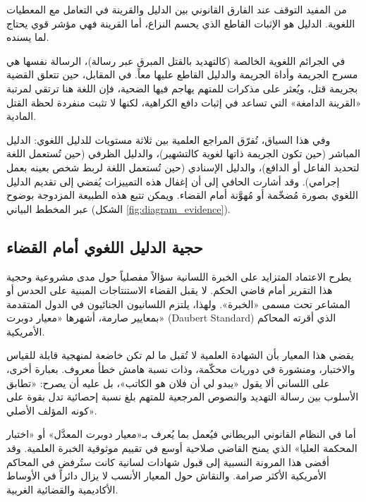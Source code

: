 من المفيد التوقف عند الفارق القانوني بين الدليل والقرينة في التعامل مع المعطيات اللغوية. الدليل هو الإثبات القاطع الذي يحسم النزاع، أما القرينة فهي مؤشر قوي يحتاج لما يسنده.

في الجرائم اللغوية الخالصة (كالتهديد بالقتل المبرق عبر رسالة)، الرسالة نفسها هي مسرح الجريمة وأداة الجريمة والدليل القاطع عليها معاً. في المقابل، حين تتعلق القضية بجريمة قتل، ويُعثر على مذكرات للمتهم يهاجم فيها الضحية، فإن اللغة هنا ترتقي لمرتبة «القرينة الدامغة» التي تساعد في إثبات دافع الكراهية، لكنها لا تثبت منفردة لحظة القتل المادية\autocite[22]{alassimi2018}.

وفي هذا السياق، تُفرّق المراجع العلمية بين ثلاثة مستويات للدليل اللغوي: الدليل المباشر (حين تكون الجريمة ذاتها لغوية كالتشهير)، والدليل الظرفي (حين تُستعمل اللغة لتحديد الفاعل أو الدافع)، والدليل الإسنادي (حين تُستعمل اللغة لربط شخص بعينه بعمل إجرامي). وقد أشارت الحافي إلى أن إغفال هذه التمييزات يُفضي إلى تقديم الدليل اللغوي بصورة مُضخّمة أو مُهوَّنة أمام القضاء\autocite[13]{alhafi2023}. ويمكن تتبع هذه الطبيعة المزدوجة بوضوح عبر المخطط البياني (الشكل \ref{fig:diagram_evidence}).

\diagramEvidence

\subsection{حجية الدليل اللغوي أمام القضاء}

يطرح الاعتماد المتزايد على الخبرة اللسانية سؤالاً مفصلياً حول مدى مشروعية وحجية هذا التقرير أمام قاضي الحكم. لا يقبل القضاء الاستنتاجات المبنية على الحدس أو المشاعر تحت مسمى «الخبرة». ولهذا، يلتزم اللسانيون الجنائيون في الدول المتقدمة بمعايير صارمة، أشهرها «معيار دوبرت» (\textenglish{Daubert Standard}) الذي أقرته المحاكم الأمريكية\autocite[96]{alabadi2020}.

يقضي هذا المعيار بأن الشهادة العلمية لا تُقبل ما لم تكن خاضعة لمنهجية قابلة للقياس والاختبار، ومنشورة في دوريات محكّمة، وذات نسبة هامش خطأ معروف. بعبارة أخرى، على اللساني ألا يقول «يبدو لي أن فلان هو الكاتب»، بل عليه أن يصرح: «تطابق الأسلوب بين رسالة التهديد والنصوص المرجعية للمتهم بلغ نسبة إحصائية تدل بقوة على كونه المؤلف الأصلي»\autocite[57]{alassimi2018}.

أما في النظام القانوني البريطاني فيُعمل بما يُعرف بـ«معيار دوبرت المعدَّل» أو «اختبار المحكمة العليا» الذي يمنح القاضي صلاحية أوسع في تقييم موثوقية الخبرة العلمية. وقد أفضى هذا المرونة النسبية إلى قبول شهادات لسانية كانت ستُرفض في المحاكم الأمريكية الأكثر صرامة. والنقاش حول المعيار الأنسب لا يزال دائراً في الأوساط الأكاديمية والقضائية الغربية.


